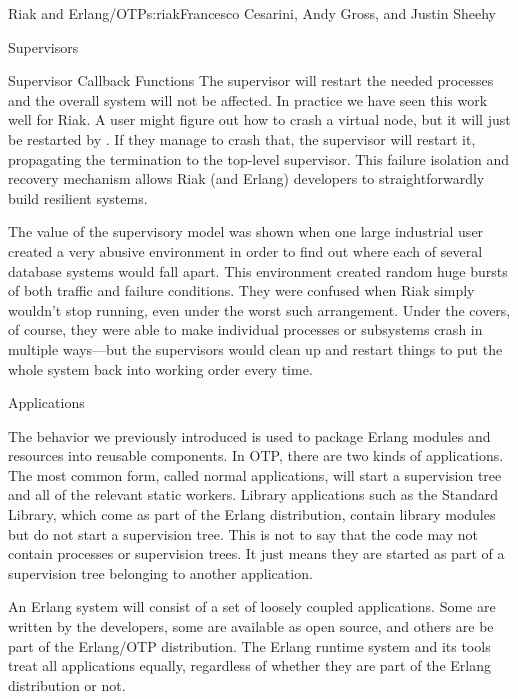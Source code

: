 \begin{aosachapter}{Riak and Erlang/OTP}{s:riak}{Francesco Cesarini, Andy Gross, and Justin Sheehy}
\begin{aosasect1}{Supervisors}
\begin{aosasect2}{Supervisor Callback Functions}
The supervisor will restart the needed processes and the overall
system will not be affected. In practice we have seen this work
well for Riak.  A user might figure out how to crash a virtual node,
but it will just be restarted by .  If
they manage to crash that, the  supervisor will
restart it, propagating the termination to the top-level supervisor.
This failure isolation and recovery mechanism allows Riak (and Erlang)
developers to straightforwardly build resilient systems.

The value of the supervisory model was shown when one large industrial
user created a very abusive environment in order to find out where
each of several database systems would fall apart.  This environment
created random huge bursts of both traffic and failure conditions.
They were confused when Riak simply wouldn't stop running, even under
the worst such arrangement.  Under the covers, of course, they were
able to make individual processes or subsystems crash in multiple
ways---but the supervisors would clean up and restart things to put
the whole system back into working order every time.

\end{aosasect2}

\begin{aosasect2}{Applications}

The  behavior we previously introduced is used to
package Erlang modules and resources into reusable components. In OTP,
there are two kinds of applications. The most common form, called
normal applications, will start a supervision tree and all of the
relevant static workers. Library applications such as the Standard
Library, which come as part of the Erlang distribution, contain
library modules but do not start a supervision tree. This is not to
say that the code may not contain processes or supervision trees. It
just means they are started as part of a supervision tree belonging to
another application.

An Erlang system will consist of a set of loosely coupled
applications. Some are written by the developers, some are available
as open source, and others are be part of the Erlang/OTP
distribution. The Erlang runtime system and its tools treat all
applications equally, regardless of whether they are part of the
Erlang distribution or not.

\end{aosasect2}

\end{aosasect1}


\end{aosachapter}
